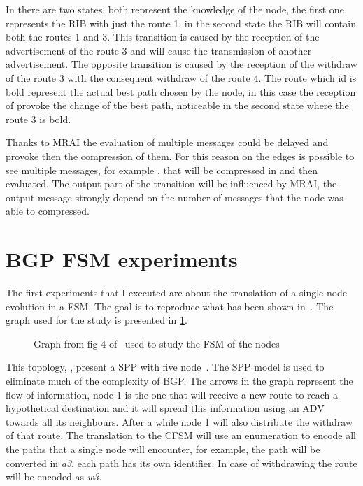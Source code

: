 In  there are two states, both represent the knowledge of
the node, the first one represents the \ac{RIB} with just the route \num{1}, in
the second state the \ac{RIB} will contain both the routes \num{1} and \num{3}.
This transition is caused by the reception of the advertisement of the route
\num{3} and will cause the transmission of another advertisement.
The opposite transition is caused by the reception of the withdraw of the route
\num{3} with the consequent withdraw of the route \num{4}.
The route which id is bold represent the actual best path chosen by the node, in
this case the reception of  provoke the change of the best path, noticeable
in the second state where the route \num{3} is bold.

Thanks to \ac{MRAI} the evaluation of multiple messages could be delayed and
provoke then the compression of them.
For this reason on the edges is possible to see multiple messages, for example
\q{[A1W1A1]}, that will be compressed in \q{[A1]} and then evaluated.
The output part of the transition will be influenced by \ac{MRAI}, the output
message strongly depend on the number of messages that the node was able
to compressed.


\section{BGP FSM experiments}
\label{sec:bgp_fsm_experiments}

The first experiments that I executed are about the translation of a single
node evolution in a \ac{FSM}.
The goal is to reproduce what has been shown in~\cite{griffinFSM}.
The graph used for the study is presented in \cref{fig:griffin_fig_4}.

\begin{figure}[h]
    \begin{center}
        
    \end{center}
	\caption{Graph from fig 4 of~\cite{griffinFSM} used to study the \ac{FSM}
		of the nodes}
    \label{fig:griffin_fig_4}
\end{figure}

This topology, , present a \ac{SPP} with five node~\cite{griffin2002stable}.
The \ac{SPP} model is used to eliminate much of the complexity of \ac{BGP}.
The arrows in the graph represent the flow of information, node \num{1} is the one
that will receive a new route to reach a hypothetical destination and it will
spread this information using an \ac{ADV} towards all its neighbours.
After a while node \num{1} will also distribute the withdraw of that route.
The translation to the \ac{CFSM} will use an enumeration to encode all the
paths that a single node will encounter, for example, the path  will
be converted in \textit{a3}, each path has its own identifier.
In case of withdrawing the route will be encoded as \textit{w3}.

